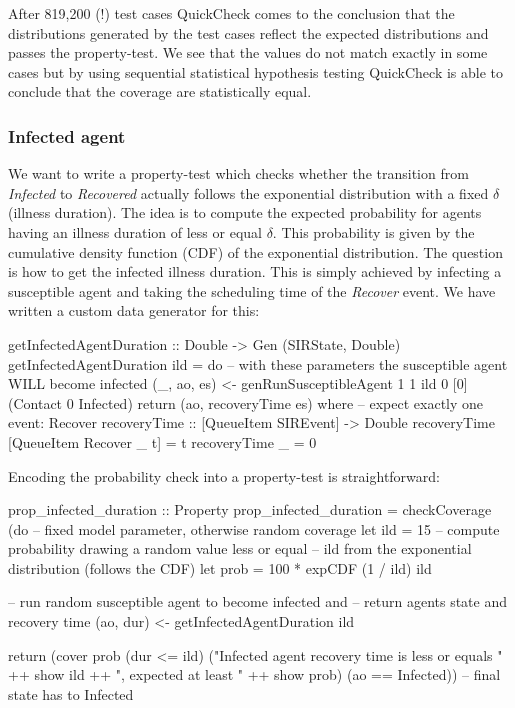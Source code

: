 After 819,200 (!) test cases QuickCheck comes to the conclusion that the distributions generated by the test cases reflect the expected distributions and passes the property-test. We see that the values do not match exactly in some cases but by using sequential statistical hypothesis testing QuickCheck is able to conclude that the coverage are statistically equal.

\subsubsection{Infected agent}
We want to write a property-test which checks whether the transition from \textit{Infected} to \textit{Recovered} actually follows the exponential distribution with a fixed $\delta$ (illness duration). The idea is to compute the expected probability for agents having an illness duration of less or equal $\delta$. This probability is given by the cumulative density function (CDF) of the exponential distribution. The question is how to get the infected illness duration. This is simply achieved by infecting a susceptible agent and taking the scheduling time of the \textit{Recover} event. We have written a custom data generator for this:

\begin{HaskellCode}
getInfectedAgentDuration :: Double -> Gen (SIRState, Double)
getInfectedAgentDuration ild = do
  -- with these parameters the susceptible agent WILL become infected
  (_, ao, es) <- genRunSusceptibleAgent 1 1 ild 0 [0] (Contact 0 Infected)
  return (ao, recoveryTime es)
  where
    -- expect exactly one event: Recover
    recoveryTime :: [QueueItem SIREvent] -> Double
    recoveryTime [QueueItem Recover _ t]  = t
    recoveryTime _ = 0
\end{HaskellCode}

Encoding the probability check into a property-test is straightforward:

\begin{HaskellCode}
prop_infected_duration :: Property
prop_infected_duration = checkCoverage (do
  -- fixed model parameter, otherwise random coverage
  let ild  = 15
  -- compute probability drawing a random value less or equal
  -- ild from the exponential distribution (follows the CDF)
  let prob = 100 * expCDF (1 / ild) ild

  -- run random susceptible agent to become infected and
  -- return agents state and recovery time
  (ao, dur) <- getInfectedAgentDuration ild

  return (cover prob (dur <= ild) 
            ("Infected agent recovery time is less or equals " ++ show ild ++ 
             ", expected at least " ++ show prob) 
            (ao == Infected)) -- final state has to Infected
\end{HaskellCode}


